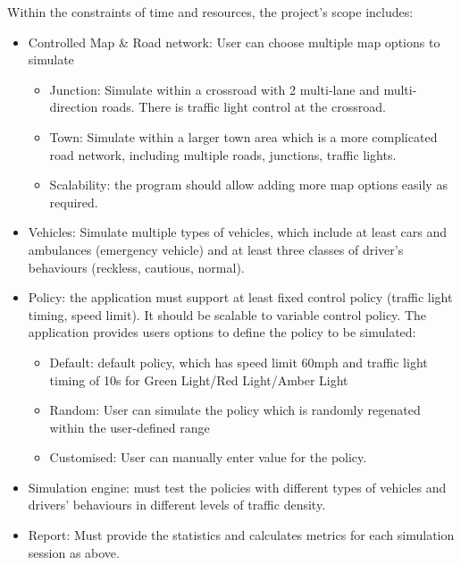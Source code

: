 \documentclass[11pt]{article}
\begin{document}
Within the constraints of time and resources, the project's scope includes:
\begin{itemize}[noitemsep]
\item Controlled Map \& Road network: User can choose multiple map options to simulate
    \begin{itemize}[noitemsep]
	\item Junction: Simulate within a crossroad with 2 multi-lane and multi-direction roads. There is traffic light control at the crossroad.
	\item Town: Simulate within a larger town area which is a more complicated road network, including multiple roads, junctions, traffic lights. 
	\item Scalability: the program should allow adding more map options easily as required. 
	
	\end{itemize}

\item Vehicles: Simulate multiple types of vehicles, which include at least cars and ambulances (emergency vehicle) and at least three classes of driver’s behaviours (reckless, cautious, normal).

\item Policy: the application must support at least fixed control policy (traffic light timing, speed limit). It should be scalable to variable control policy. The application provides users options to define the policy to be simulated:
    \begin{itemize}
    \item Default: default policy, which has speed limit 60mph and traffic light timing of 10s for Green Light/Red Light/Amber Light
    \item Random: User can simulate the policy which is randomly regenated within the user-defined range
    \item Customised: User can manually enter value for the policy.
    \end{itemize}

\item Simulation engine: must test the policies with different types of vehicles and drivers' behaviours in different levels of traffic density.
\item Report: Must provide the statistics and calculates metrics  for each simulation session as above.
\end{itemize}

	
\end{document}
